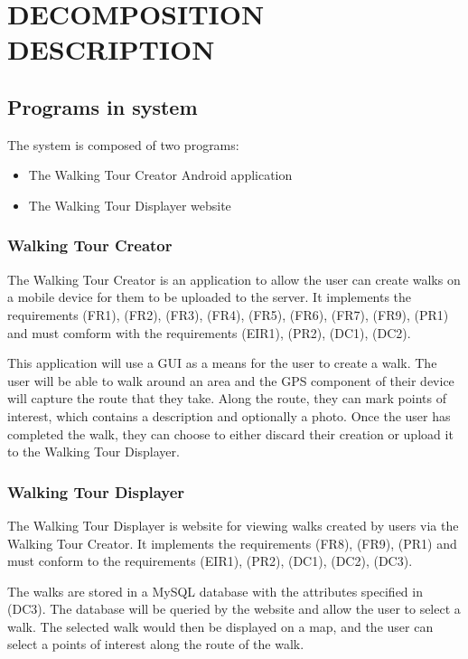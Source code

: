 \documentclass{project}
\begin{document}
\newpage

\section{DECOMPOSITION DESCRIPTION}
\subsection{Programs in system}
The system is composed of two programs:
\begin{itemize}
\item The Walking Tour Creator Android application
\item The Walking Tour Displayer website
\end{itemize}


\subsubsection{Walking Tour Creator}
The Walking Tour Creator is an application to allow the user can create walks
on a mobile device for them to be uploaded to the server. It implements the
requirements (FR1), (FR2), (FR3), (FR4), (FR5), (FR6), (FR7), (FR9), (PR1) and
must comform with the requirements (EIR1), (PR2), (DC1), (DC2).\cite{se.qa.rs}

This application will use a GUI as a means for the user to create a walk. The
user will be able to walk around an area and the GPS component of their device
will capture the route that they take. Along the route, they can mark points of
interest, which contains a description and optionally a photo. Once the user
has completed the walk, they can choose to either discard their creation or
upload it to the Walking Tour Displayer.

\subsubsection{Walking Tour Displayer}
The Walking Tour Displayer is website for viewing walks created by users via
the Walking Tour Creator. It implements the requirements (FR8), (FR9), (PR1)
and must conform to the requirements (EIR1), (PR2), (DC1), (DC2),
(DC3).\cite{se.qa.rs}

The walks are stored in a MySQL database with the attributes specified in
(DC3). The database will be queried by the website and allow the user to select
a walk. The selected walk would then be displayed on a map, and the user can
select a points of interest along the route of the walk.
\end{document}
